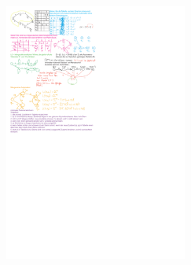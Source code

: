 \documentclass[a4paper,10pt,landscape,twocolumn]{article}
\begin{document}
\includegraphics[width=0.45\textwidth,keepaspectratio]{Bild1Zufa.pdf}\\
\end{document}
